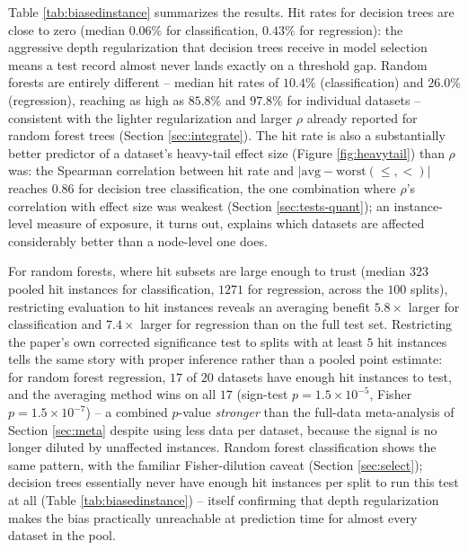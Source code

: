\documentclass[5p,twocolumn,authoryear]{elsarticle}
\theoremstyle{plain}%
\theoremstyle{remark}%
\theoremstyle{definition}%
\begin{document}
Table \ref{tab:biasedinstance} summarizes the results. Hit rates for decision trees are close to zero (median $0.06\%$ for classification, $0.43\%$ for regression): the aggressive depth regularization that decision trees receive in model selection means a test record almost never lands exactly on a threshold gap. Random forests are entirely different -- median hit rates of $10.4\%$ (classification) and $26.0\%$ (regression), reaching as high as $85.8\%$ and $97.8\%$ for individual datasets -- consistent with the lighter regularization and larger $\rho$ already reported for random forest trees (Section \ref{sec:integrate}). The hit rate is also a substantially better predictor of a dataset's heavy-tail effect size (Figure \ref{fig:heavytail}) than $\rho$ was: the Spearman correlation between hit rate and $|\text{avg} - \text{worst}(\leq,<)|$ reaches $0.86$ for decision tree classification, the one combination where $\rho$'s correlation with effect size was weakest (Section \ref{sec:tests-quant}); an instance-level measure of exposure, it turns out, explains which datasets are affected considerably better than a node-level one does.

For random forests, where hit subsets are large enough to trust (median $323$ pooled hit instances for classification, $1271$ for regression, across the $100$ splits), restricting evaluation to hit instances reveals an averaging benefit $5.8\times$ larger for classification and $7.4\times$ larger for regression than on the full test set. Restricting the paper's own corrected significance test to splits with at least $5$ hit instances tells the same story with proper inference rather than a pooled point estimate: for random forest regression, $17$ of $20$ datasets have enough hit instances to test, and the averaging method wins on all $17$ (sign-test $p=1.5\times10^{-5}$, Fisher $p=1.5\times10^{-7}$) -- a combined $p$-value \emph{stronger} than the full-data meta-analysis of Section \ref{sec:meta} despite using less data per dataset, because the signal is no longer diluted by unaffected instances. Random forest classification shows the same pattern, with the familiar Fisher-dilution caveat (Section \ref{sec:select}); decision trees essentially never have enough hit instances per split to run this test at all (Table \ref{tab:biasedinstance}) -- itself confirming that depth regularization makes the bias practically unreachable at prediction time for almost every dataset in the pool.
\end{document}
